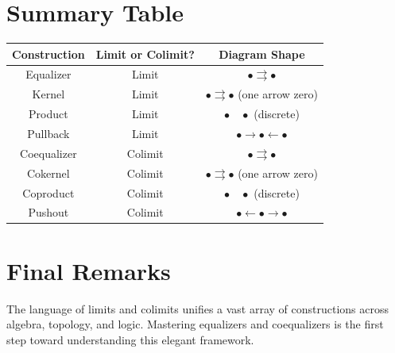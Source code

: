 \documentclass{article}
\theoremstyle{definition}
\begin{document}
\section{Summary Table}
\begin{center}
\begin{tabular}{c|c|c}
\textbf{Construction} & \textbf{Limit or Colimit?} & \textbf{Diagram Shape} \\
\hline
Equalizer & Limit & $\bullet \rightrightarrows \bullet$ \\
Kernel & Limit & $\bullet \rightrightarrows \bullet$ (one arrow zero) \\
Product & Limit & $\bullet \quad \bullet$ (discrete) \\
Pullback & Limit & $\bullet \to \bullet \leftarrow \bullet$ \\
Coequalizer & Colimit & $\bullet \rightrightarrows \bullet$ \\
Cokernel & Colimit & $\bullet \rightrightarrows \bullet$ (one arrow zero) \\
Coproduct & Colimit & $\bullet \quad \bullet$ (discrete) \\
Pushout & Colimit & $\bullet \leftarrow \bullet \to \bullet$
\end{tabular}
\end{center}

\section*{Final Remarks}
The language of limits and colimits unifies a vast array of constructions across algebra, topology, and logic. Mastering equalizers and coequalizers is the first step toward understanding this elegant framework.
\end{document}

